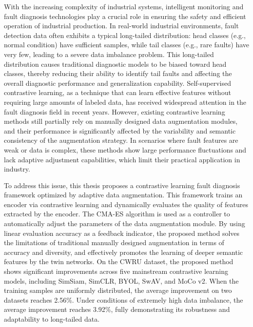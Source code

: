 \documentclass[master]{thesis-uestc}
\begin{document}
\begin{englishabstract}
    With the increasing complexity of industrial systems, intelligent monitoring and fault diagnosis technologies play a crucial role in ensuring the safety and efficient operation of industrial production. In real-world industrial environments, fault detection data often exhibits a typical long-tailed distribution: head classes (e.g., normal condition) have sufficient samples, while tail classes (e.g., rare faults) have very few, leading to a severe data imbalance problem. This long-tailed distribution causes traditional diagnostic models to be biased toward head classes, thereby reducing their ability to identify tail faults and affecting the overall diagnostic performance and generalization capability. Self-supervised contrastive learning, as a technique that can learn effective features without requiring large amounts of labeled data, has received widespread attention in the fault diagnosis field in recent years. However, existing contrastive learning methods still partially rely on manually designed data augmentation modules, and their performance is significantly affected by the variability and semantic consistency of the augmentation strategy. In scenarios where fault features are weak or data is complex, these methods show large performance fluctuations and lack adaptive adjustment capabilities, which limit their practical application in industry.

    To address this issue, this thesis proposes a contrastive learning fault diagnosis framework optimized by adaptive data augmentation. This framework trains an encoder via contrastive learning and dynamically evaluates the quality of features extracted by the encoder. The CMA-ES algorithm is used as a controller to automatically adjust the parameters of the data augmentation module. By using linear evaluation accuracy as a feedback indicator, the proposed method solves the limitations of traditional manually designed augmentation in terms of accuracy and diversity, and effectively promotes the learning of deeper semantic features by the twin networks. On the CWRU dataset, the proposed method shows significant improvements across five mainstream contrastive learning models, including SimSiam, SimCLR, BYOL, SwAV, and MoCo v2. When the training samples are uniformly distributed, the average improvement on two datasets reaches 2.56\%. Under conditions of extremely high data imbalance, the average improvement reaches 3.92\%, fully demonstrating its robustness and adaptability to long-tailed data.


\end{englishabstract}
\end{document}
